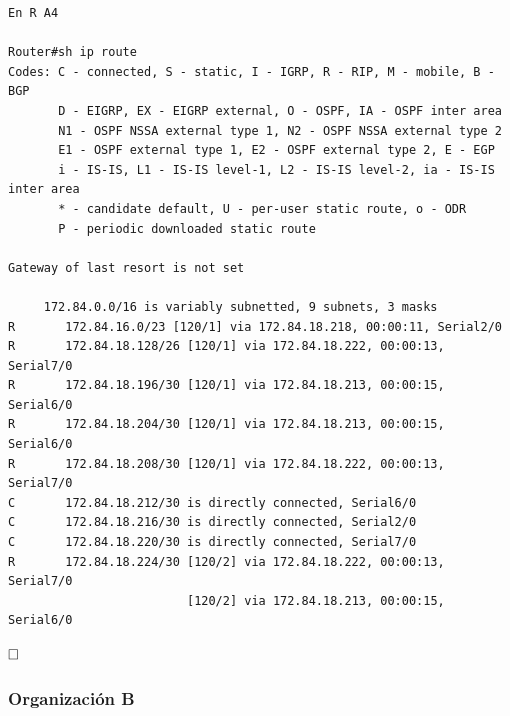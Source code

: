 \documentclass[11pt]{article}
\begin{document}
\begin{enumerate}
\begin{mdframed}
\begin{verbatim}
En R A4

Router#sh ip route
Codes: C - connected, S - static, I - IGRP, R - RIP, M - mobile, B - BGP
       D - EIGRP, EX - EIGRP external, O - OSPF, IA - OSPF inter area
       N1 - OSPF NSSA external type 1, N2 - OSPF NSSA external type 2
       E1 - OSPF external type 1, E2 - OSPF external type 2, E - EGP
       i - IS-IS, L1 - IS-IS level-1, L2 - IS-IS level-2, ia - IS-IS inter area
       * - candidate default, U - per-user static route, o - ODR
       P - periodic downloaded static route

Gateway of last resort is not set

     172.84.0.0/16 is variably subnetted, 9 subnets, 3 masks
R       172.84.16.0/23 [120/1] via 172.84.18.218, 00:00:11, Serial2/0
R       172.84.18.128/26 [120/1] via 172.84.18.222, 00:00:13, Serial7/0
R       172.84.18.196/30 [120/1] via 172.84.18.213, 00:00:15, Serial6/0
R       172.84.18.204/30 [120/1] via 172.84.18.213, 00:00:15, Serial6/0
R       172.84.18.208/30 [120/1] via 172.84.18.222, 00:00:13, Serial7/0
C       172.84.18.212/30 is directly connected, Serial6/0
C       172.84.18.216/30 is directly connected, Serial2/0
C       172.84.18.220/30 is directly connected, Serial7/0
R       172.84.18.224/30 [120/2] via 172.84.18.222, 00:00:13, Serial7/0
                         [120/2] via 172.84.18.213, 00:00:15, Serial6/0

\end{verbatim}
\end{mdframed}


$\hfill\square$

\end{enumerate}

\newpage

\subsubsection{Organización B}
\end{document}
